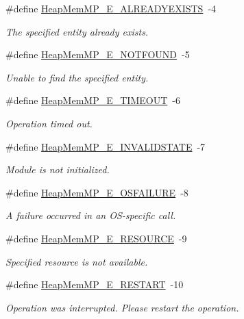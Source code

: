 \begin{DoxyCompactItemize}
\#define \hyperlink{_heap_mem_m_p_8h_a5c0844490d41dbf13f3746f6ff3b0fbb}{Heap\-Mem\-M\-P\-\_\-\-E\-\_\-\-A\-L\-R\-E\-A\-D\-Y\-E\-X\-I\-S\-T\-S}~-\/4
\begin{DoxyCompactList}\small\item\em The specified entity already exists. \end{DoxyCompactList}\item 
\#define \hyperlink{_heap_mem_m_p_8h_aeee2167e40995fa214c8b26407937513}{Heap\-Mem\-M\-P\-\_\-\-E\-\_\-\-N\-O\-T\-F\-O\-U\-N\-D}~-\/5
\begin{DoxyCompactList}\small\item\em Unable to find the specified entity. \end{DoxyCompactList}\item 
\#define \hyperlink{_heap_mem_m_p_8h_a59e36864ebc19f31f38801cd4f6b8927}{Heap\-Mem\-M\-P\-\_\-\-E\-\_\-\-T\-I\-M\-E\-O\-U\-T}~-\/6
\begin{DoxyCompactList}\small\item\em Operation timed out. \end{DoxyCompactList}\item 
\#define \hyperlink{_heap_mem_m_p_8h_ae59ad8c5c037aef22e16cf90beabc93c}{Heap\-Mem\-M\-P\-\_\-\-E\-\_\-\-I\-N\-V\-A\-L\-I\-D\-S\-T\-A\-T\-E}~-\/7
\begin{DoxyCompactList}\small\item\em Module is not initialized. \end{DoxyCompactList}\item 
\#define \hyperlink{_heap_mem_m_p_8h_a125464679440a2d5ec7f80e9a40035c1}{Heap\-Mem\-M\-P\-\_\-\-E\-\_\-\-O\-S\-F\-A\-I\-L\-U\-R\-E}~-\/8
\begin{DoxyCompactList}\small\item\em A failure occurred in an O\-S-\/specific call. \end{DoxyCompactList}\item 
\#define \hyperlink{_heap_mem_m_p_8h_a59a512963c177b9e026486d270c3556f}{Heap\-Mem\-M\-P\-\_\-\-E\-\_\-\-R\-E\-S\-O\-U\-R\-C\-E}~-\/9
\begin{DoxyCompactList}\small\item\em Specified resource is not available. \end{DoxyCompactList}\item 
\#define \hyperlink{_heap_mem_m_p_8h_a50fc296659efef22fea5863af26930d5}{Heap\-Mem\-M\-P\-\_\-\-E\-\_\-\-R\-E\-S\-T\-A\-R\-T}~-\/10
\begin{DoxyCompactList}\small\item\em Operation was interrupted. Please restart the operation. \end{DoxyCompactList}\end{DoxyCompactItemize}
